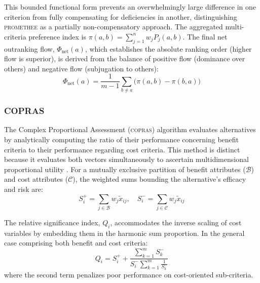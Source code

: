 \documentclass[12pt,a4paper]{article}
\newcommand{\COPRAS}{\textsc{copras}\xspace}
\begin{document}
This bounded functional form prevents an overwhelmingly large difference in one criterion from fully compensating for deficiencies in another, distinguishing \textsc{promethee} as a partially non-compensatory approach. The aggregated multi-criteria preference index is \( \pi(a,b) = \sum_{j=1}^{n} w_j P_j(a,b) \). The final net outranking flow, \( \Phi_{\text{net}}(a) \), which establishes the absolute ranking order (higher flow is superior), is derived from the balance of positive flow (dominance over others) and negative flow (subjugation to others):
\begin{equation}
    \Phi_{\text{net}}(a) = \frac{1}{m - 1} \sum_{b \neq a} \Big( \pi(a,b) - \pi(b,a) \Big)
\end{equation}

\subsubsection{COPRAS}
\label{subsubsec:copras}
The Complex Proportional Assessment (\COPRAS) algorithm evaluates alternatives by analytically computing the ratio of their performance concerning benefit criteria to their performance regarding cost criteria. This method is distinct because it evaluates both vectors simultaneously to ascertain multidimensional proportional utility \citep{Zavadskas1994}. For a mutually exclusive partition of benefit attributes (\( \mathcal{B} \)) and cost attributes (\( \mathcal{C} \)), the weighted sums bounding the alternative's efficacy and risk are:
\begin{equation}
    S_i^+ = \sum_{j \in \mathcal{B}} w_j \tilde{x}_{ij}, \quad S_i^- = \sum_{j \in \mathcal{C}} w_j \tilde{x}_{ij}
\end{equation}

The relative significance index, \( Q_i \), accommodates the inverse scaling of cost variables by embedding them in the harmonic sum proportion. In the general case comprising both benefit and cost criteria:
\begin{equation}
    Q_i = S_i^+ + \frac{\sum_{k=1}^{m} S_k^-}{S_i^- \sum_{k=1}^{m} \frac{1}{S_k^-}}
\end{equation}
where the second term penalizes poor performance on cost-oriented sub-criteria.
\end{document}
